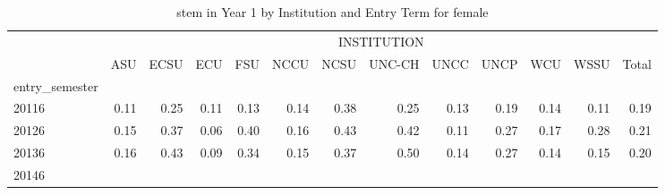 \begin{table}[!h]
\caption{stem in Year 1 by Institution and Entry Term for female}
\centering
\begin{tabular}{lllllllllllll}
\cline{1-13}
\multicolumn{1}{c}{} &
  \multicolumn{12}{|c}{INSTITUTION} \\
\multicolumn{1}{c}{} &
  \multicolumn{1}{|r}{ASU} &
  \multicolumn{1}{r}{ECSU} &
  \multicolumn{1}{r}{ECU} &
  \multicolumn{1}{r}{FSU} &
  \multicolumn{1}{r}{NCCU} &
  \multicolumn{1}{r}{NCSU} &
  \multicolumn{1}{r}{UNC-CH} &
  \multicolumn{1}{r}{UNCC} &
  \multicolumn{1}{r}{UNCP} &
  \multicolumn{1}{r}{WCU} &
  \multicolumn{1}{r}{WSSU} &
  \multicolumn{1}{r}{Total} \\
\cline{1-13}
\multicolumn{1}{l}{entry\_semester} &
  \multicolumn{1}{|r}{} &
  \multicolumn{1}{r}{} &
  \multicolumn{1}{r}{} &
  \multicolumn{1}{r}{} &
  \multicolumn{1}{r}{} &
  \multicolumn{1}{r}{} &
  \multicolumn{1}{r}{} &
  \multicolumn{1}{r}{} &
  \multicolumn{1}{r}{} &
  \multicolumn{1}{r}{} &
  \multicolumn{1}{r}{} &
  \multicolumn{1}{r}{} \\
\multicolumn{1}{l}{\hspace{1em}20116} &
  \multicolumn{1}{|r}{0.11} &
  \multicolumn{1}{r}{0.25} &
  \multicolumn{1}{r}{0.11} &
  \multicolumn{1}{r}{0.13} &
  \multicolumn{1}{r}{0.14} &
  \multicolumn{1}{r}{0.38} &
  \multicolumn{1}{r}{0.25} &
  \multicolumn{1}{r}{0.13} &
  \multicolumn{1}{r}{0.19} &
  \multicolumn{1}{r}{0.14} &
  \multicolumn{1}{r}{0.11} &
  \multicolumn{1}{r}{0.19} \\
\multicolumn{1}{l}{\hspace{1em}20126} &
  \multicolumn{1}{|r}{0.15} &
  \multicolumn{1}{r}{0.37} &
  \multicolumn{1}{r}{0.06} &
  \multicolumn{1}{r}{0.40} &
  \multicolumn{1}{r}{0.16} &
  \multicolumn{1}{r}{0.43} &
  \multicolumn{1}{r}{0.42} &
  \multicolumn{1}{r}{0.11} &
  \multicolumn{1}{r}{0.27} &
  \multicolumn{1}{r}{0.17} &
  \multicolumn{1}{r}{0.28} &
  \multicolumn{1}{r}{0.21} \\
\multicolumn{1}{l}{\hspace{1em}20136} &
  \multicolumn{1}{|r}{0.16} &
  \multicolumn{1}{r}{0.43} &
  \multicolumn{1}{r}{0.09} &
  \multicolumn{1}{r}{0.34} &
  \multicolumn{1}{r}{0.15} &
  \multicolumn{1}{r}{0.37} &
  \multicolumn{1}{r}{0.50} &
  \multicolumn{1}{r}{0.14} &
  \multicolumn{1}{r}{0.27} &
  \multicolumn{1}{r}{0.14} &
  \multicolumn{1}{r}{0.15} &
  \multicolumn{1}{r}{0.20} \\
\multicolumn{1}{l}{\hspace{1em}20146} &

\end{tabular}
\end{table}
